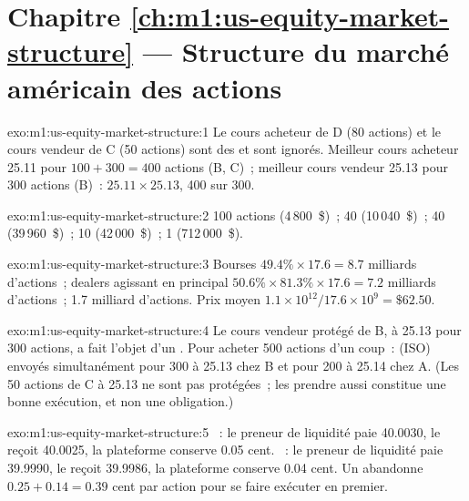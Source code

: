 \section*{Chapitre \ref{ch:m1:us-equity-market-structure} --- Structure du marché américain des actions}

\begin{solution}{exo:m1:us-equity-market-structure:1}
Le cours acheteur de D (80 actions) et le cours vendeur de C (50 actions) sont des  et sont ignorés.
Meilleur cours acheteur 25.11 pour $100 + 300 = 400$ actions (B, C)~; meilleur cours vendeur 25.13 pour 300
actions (B)~: $25.11 \times 25.13$, 400 sur 300.
\end{solution}

\begin{solution}{exo:m1:us-equity-market-structure:2}
100 actions (4\,800~\$)~; 40 (10\,040~\$)~; 40 (39\,960~\$)~; 10 (42\,000~\$)~; 1
(712\,000~\$).
\end{solution}

\begin{solution}{exo:m1:us-equity-market-structure:3}
Bourses $49.4\% \times 17.6 = 8.7$ milliards d'actions~; dealers agissant en principal
$50.6\% \times 81.3\% \times 17.6 = 7.2$ milliards d'actions~; 
1.7 milliard d'actions. Prix moyen $1.1\times10^{12}/17.6\times10^9 = \$62.50$.
\end{solution}

\begin{solution}{exo:m1:us-equity-market-structure:4}
Le cours vendeur protégé de B, à 25.13 pour 300 actions, a fait l'objet d'un . Pour acheter 500 actions
d'un coup~:  (ISO) envoyés simultanément pour 300 à 25.13 chez B et
pour 200 à 25.14 chez A. (Les 50 actions de C à 25.13 ne sont pas protégées~; les prendre
aussi constitue une bonne exécution, et non une obligation.)
\end{solution}

\begin{solution}{exo:m1:us-equity-market-structure:5}
~: le preneur de liquidité paie 40.0030, le  reçoit 40.0025, la plateforme conserve 0.05
cent. ~: le preneur de liquidité paie 39.9990, le  reçoit 39.9986, la plateforme conserve 0.04
cent. Un  abandonne $0.25 + 0.14 = 0.39$ cent par action pour se faire exécuter en premier.
\end{solution}

